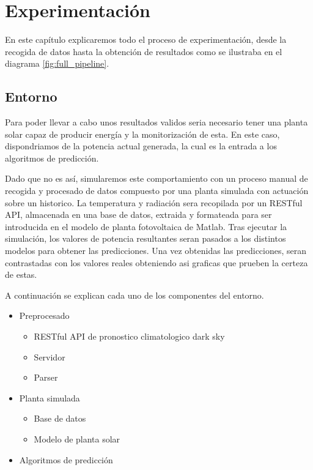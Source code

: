 \chapter{Experimentación}

\graphicspath{ {./graphs/} }

En este capítulo explicaremos todo el proceso de experimentación, desde la recogida de datos hasta la obtención de resultados como se ilustraba en el diagrama \ref{fig:full_pipeline}.



\section{Entorno}

Para poder llevar a cabo unos resultados validos seria necesario tener una planta solar capaz de producir energía y la monitorización de esta. En este caso, dispondriamos de la potencia actual generada, la cual es la entrada a los algoritmos de predicción. 

Dado que no es así, simularemos este comportamiento con un proceso manual de recogida y procesado de datos compuesto por una planta simulada con actuación sobre un historico.
La temperatura y radiación sera recopilada por un RESTful API, almacenada en una base de datos, extraida y formateada para ser introducida en el modelo de planta fotovoltaica de Matlab.
Tras ejecutar la simulación, los valores de potencia resultantes seran pasados a los distintos modelos para obtener las predicciones.
Una vez obtenidas las predicciones, seran contrastadas con los valores reales obteniendo asi graficas que prueben la certeza de estas.

A continuación se explican cada uno de los componentes del entorno.

\begin{itemize}
    \item Preprocesado
    \begin{itemize}
        \item RESTful API de pronostico climatologico dark sky
        \item Servidor
        \item Parser
    \end{itemize}
    \item Planta simulada
    \begin{itemize}
        \item Base de datos
        \item Modelo de planta solar
    \end{itemize}
    \item Algoritmos de predicción
\end{itemize}


